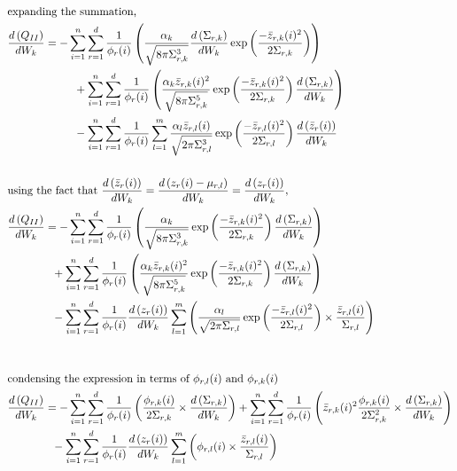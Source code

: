 \documentclass[]{article}
\begin{document}
\begin{align*}
& \text{expanding the summation,}  \\
& \der{W_k}{Q_{II}} = -\sum\limits_{i=1}^n \sum\limits_{r=1}^{d}\frac{1}{\phi_r(i)} \left( \frac{\alpha_k}{\sqrt{8\pi\Sigma_{r,k}^3}} \der{W_k}{\Sigma_{r,k}} \exp\left( \frac{-\bar{z}_{r,k}(i)^2}{2\Sigma_{r,k}}\right) \right) \nonumber \\ 
& \qquad \qquad \qquad + \sum\limits_{i=1}^n \sum\limits_{r=1}^{d}\frac{1}{\phi_r(i)} \left( \frac{\alpha_k \bar{z}_{r,k}(i)^2}{\sqrt{8\pi\Sigma_{r,k}^5}} \exp\left( \frac{-\bar{z}_{r,k}(i)^2}{2\Sigma_{r,k}}\right) \der{W_k}{\Sigma_{r,k}} \right)  \\ 
& \qquad \qquad \qquad - \sum\limits_{i=1}^n \sum\limits_{r=1}^{d}\frac{1}{\phi_r(i)} \sum\limits_{l=1}^{m} \frac{\alpha_l\bar{z}_{r,l}(i)}{\sqrt{2\pi\Sigma_{r,l}^3}} \exp\left( \frac{-\bar{z}_{r,l}(i)^2}{2\Sigma_{r,l}}\right)\der{W_k}{\bar{z}_r(i)} \\ \\
& \text{using the fact that } \der{W_k}{\bar{z}_r(i)} = \der{W_k}{z_r(i)-\mu_{r,l}} = \der{W_k}{z_r(i)},   \\
& \der{W_k}{Q_{II}} = -\sum\limits_{i=1}^n \sum\limits_{r=1}^{d}\frac{1}{\phi_r(i)} \left( \frac{\alpha_k}{\sqrt{8\pi\Sigma_{r,k}^3}} \exp\left( \frac{-\bar{z}_{r,k}(i)^2}{2\Sigma_{r,k}}\right) \der{W_k}{\Sigma_{r,k}} \right)  \\ 
& \qquad \qquad + \sum\limits_{i=1}^n \sum\limits_{r=1}^{d}\frac{1}{\phi_r(i)} \left( \frac{\alpha_k \bar{z}_{r,k}(i)^2}{\sqrt{8\pi\Sigma_{r,k}^5}} \exp\left( \frac{-\bar{z}_{r,k}(i)^2}{2\Sigma_{r,k}}\right) \der{W_k}{\Sigma_{r,k}} \right)  \\ 
& \qquad \qquad -\sum\limits_{i=1}^n \sum\limits_{r=1}^{d}\frac{1}{\phi_r(i)}\der{W_k}{z_r(i)} \sum\limits_{l=1}^{m} \left( \frac{\alpha_l}{\sqrt{2\pi\Sigma_{r,l}}} \exp\left( \frac{-\bar{z}_{r,l}(i)^2}{2\Sigma_{r,l}}\right) \times \frac{\bar{z}_{r,l}(i)}{\Sigma_{r,l}} \right) \\
 \\ \\ 
& \text{condensing the expression in terms of } \phi_{r,l}(i) \text{ and } \phi_{r,k}(i) \\
& \der{W_k}{Q_{II}} = -\sum\limits_{i=1}^n \sum\limits_{r=1}^{d}\frac{1}{\phi_r(i)} \left( \frac{\phi_{r,k}(i)}{2\Sigma_{r,k}} \times \der{W_k}{\Sigma_{r,k}} \right) + \sum\limits_{i=1}^n \sum\limits_{r=1}^{d}\frac{1}{\phi_r(i)} \left( \bar{z}_{r,k}(i)^2 \frac{\phi_{r,k}(i)}{2\Sigma^2_{r,k}} \times \der{W_k}{\Sigma_{r,k}} \right)  \\ 
& \qquad \qquad -\sum\limits_{i=1}^n \sum\limits_{r=1}^{d}\frac{1}{\phi_r(i)}\der{W_k}{z_r(i)} \sum\limits_{l=1}^{m} \left( \phi_{r,l}(i) \times \frac{\bar{z}_{r,l}(i)}{\Sigma_{r,l}} \right)
\end{align*}
\\ \\
\end{document}
